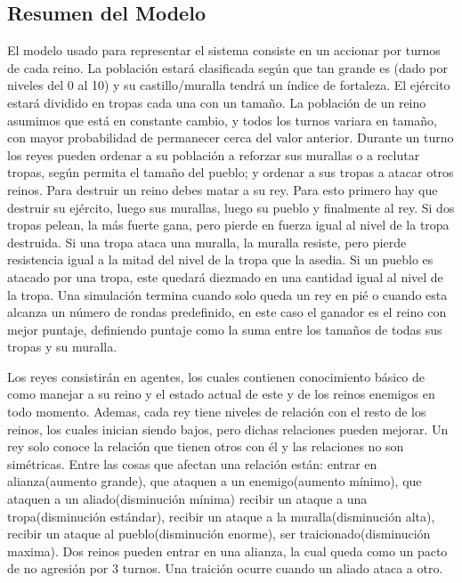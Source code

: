 \documentclass[11pt]{article}
\begin{document}
        \subsection{Resumen del Modelo}
        El modelo usado para representar el sistema consiste en un accionar por turnos 
        de cada reino. La población estará clasificada según que tan grande es (dado por 
        niveles del 0 al 10) y su castillo/muralla tendrá un índice de fortaleza. El 
        ejército estará dividido en tropas cada una con un tamaño. La población de un reino 
        asumimos que está en constante cambio, y todos los turnos variara en tamaño, con mayor 
        probabilidad de permanecer cerca del valor anterior. Durante un turno los reyes pueden 
        ordenar a su población a reforzar sus murallas o a reclutar tropas, según permita el 
        tamaño del pueblo; y ordenar a sus tropas a atacar otros reinos. Para destruir un reino 
        debes matar a su rey. Para esto primero hay que destruir su ejército, luego sus murallas, 
        luego su pueblo y finalmente al rey. Si dos tropas pelean, la más fuerte gana, pero 
        pierde en fuerza igual al nivel de la tropa destruida. Si una tropa ataca una muralla, 
        la muralla resiste, pero pierde resistencia igual a la mitad del nivel de la tropa que la 
        asedia. Si un pueblo es atacado por una tropa, este quedará diezmado en una cantidad igual 
        al nivel de la tropa. Una simulación termina cuando solo queda un rey en pié o cuando esta
        alcanza un número de rondas predefinido, en este caso el ganador es el reino con mejor puntaje,
        definiendo puntaje como la suma entre los tamaños de todas sus tropas y su muralla. \vspace{5mm}

        \noindent Los reyes consistirán en agentes, los cuales contienen conocimiento básico de como manejar 
        a su reino y el estado actual de este y de los reinos enemigos en todo momento. Ademas, 
        cada rey tiene niveles de relación con el resto de los reinos, los cuales inician siendo 
        bajos, pero dichas relaciones pueden mejorar. Un rey solo conoce la relación que tienen 
        otros con él y las relaciones no son simétricas. Entre las cosas que afectan una relación 
        están: entrar en alianza(aumento grande), que ataquen a un enemigo(aumento mínimo), que 
        ataquen a un aliado(disminución mínima) recibir un ataque a una tropa(disminución estándar), 
        recibir un ataque a la muralla(disminución alta), recibir un ataque al pueblo(disminución enorme), 
        ser traicionado(disminución maxima). Dos reinos pueden entrar en una alianza, la cual queda 
        como un pacto de no agresión por 3 turnos. Una traición ocurre cuando un aliado ataca a otro. \vspace{5mm}
\end{document}
